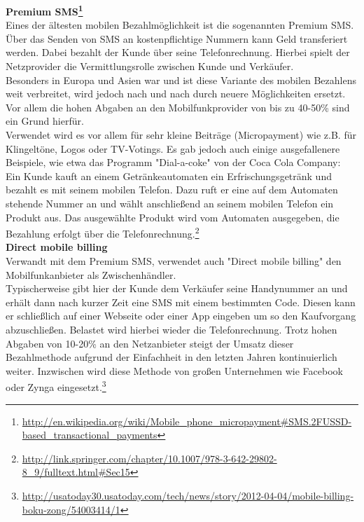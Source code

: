 \textbf{Premium SMS\footnote{\url{http://en.wikipedia.org/wiki/Mobile_phone_micropayment\#SMS.2FUSSD-based_transactional_payments}}}\\
Eines der ältesten mobilen Bezahlmöglichkeit ist die sogenannten Premium SMS. Über das Senden von SMS an kostenpflichtige Nummern kann Geld transferiert werden. Dabei bezahlt der Kunde über seine Telefonrechnung. Hierbei spielt der Netzprovider die Vermittlungsrolle zwischen Kunde und Verkäufer.\\
Besonders in Europa und Asien war und ist diese Variante des mobilen Bezahlens weit verbreitet, wird jedoch nach und nach durch neuere Möglichkeiten ersetzt. Vor allem die hohen Abgaben an den Mobilfunkprovider von bis zu 40-50\% sind ein Grund hierfür.\\
Verwendet wird es vor allem für sehr kleine Beiträge (Micropayment) wie z.B. für Klingeltöne, Logos oder TV-Votings. Es gab jedoch auch einige ausgefallenere Beispiele, wie etwa das Programm "Dial-a-coke" von der Coca Cola Company: Ein Kunde kauft an einem Getränkeautomaten ein Erfrischungsgetränk und bezahlt es mit seinem mobilen Telefon. Dazu ruft er eine auf dem Automaten stehende Nummer an und wählt anschließend an seinem mobilen Telefon ein Produkt aus. Das ausgewählte Produkt wird vom Automaten ausgegeben, die Bezahlung erfolgt über die Telefonrechnung.\footnote{\url{http://link.springer.com/chapter/10.1007/978-3-642-29802-8_9/fulltext.html\#Sec15}}\\
 
\textbf{Direct mobile billing}\\
Verwandt mit dem Premium SMS, verwendet auch "Direct mobile billing" den Mobilfunkanbieter als Zwischenhändler.\\
Typischerweise gibt hier der Kunde dem Verkäufer seine Handynummer an und erhält dann nach kurzer Zeit eine SMS mit einem bestimmten Code. Diesen kann er schließlich auf einer Webseite oder einer App eingeben um so den Kaufvorgang abzuschließen. Belastet wird hierbei wieder die Telefonrechnung.
Trotz hohen Abgaben von 10-20\% an den Netzanbieter steigt der Umsatz dieser Bezahlmethode aufgrund der Einfachheit in den letzten Jahren kontinuierlich weiter. Inzwischen wird diese Methode von großen Unternehmen wie Facebook oder Zynga eingesetzt.\footnote{\url{http://usatoday30.usatoday.com/tech/news/story/2012-04-04/mobile-billing-boku-zong/54003414/1}}\\


